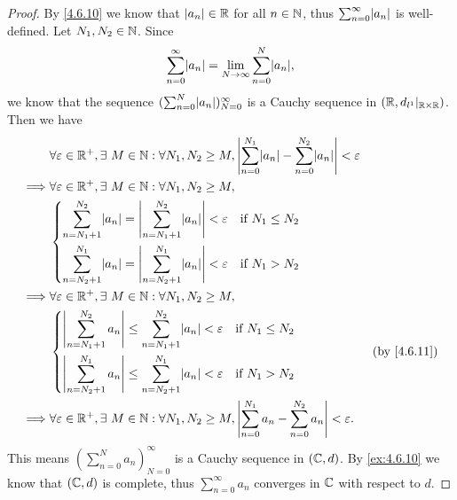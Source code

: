 \begin{proof}
  By \cref{4.6.10} we know that \(\left\lvert a_n\right\rvert \in \mathbb{R}\) for all \(n \in \mathbb{N}\), thus \(\sum_{n = 0}^\infty \abs{a_n}\) is well-defined.
  Let \(N_1, N_2 \in \mathbb{N}\).
  Since
  \[
    \sum_{n = 0}^\infty \abs{a_n} = \lim_{N \to \infty} \sum_{n = 0}^N \abs{a_n},
  \]
  we know that the sequence \((\sum_{n = 0}^N \abs{a_n})_{N = 0}^\infty\) is a Cauchy sequence in \((\mathbb{R}, d_{l^1}|_{\mathbb{R} \times \mathbb{R}})\).
  Then we have
  \begin{align*}
             & \forall \varepsilon \in \R^+, \exists\ M \in \N : \forall N_1, N_2 \geq M, \abs{\sum_{n = 0}^{N_1} \abs{a_n} - \sum_{n = 0}^{N_2} \abs{a_n}} < \varepsilon \\
    \implies & \forall \varepsilon \in \R^+, \exists\ M \in \N : \forall N_1, N_2 \geq M,                                                                                 \\
             & \begin{dcases}
                 \sum_{n = N_1 + 1}^{N_2} \abs{a_n} = \abs{\sum_{n = N_1 + 1}^{N_2} \abs{a_n}} < \varepsilon & \text{if } N_1 \leq N_2 \\
                 \sum_{n = N_2 + 1}^{N_1} \abs{a_n} = \abs{\sum_{n = N_2 + 1}^{N_1} \abs{a_n}} < \varepsilon & \text{if } N_1 > N_2
               \end{dcases}                         \\
    \implies & \forall \varepsilon \in \R^+, \exists\ M \in \N : \forall N_1, N_2 \geq M,                                                                                 \\
             & \begin{dcases}
                 \abs{\sum_{n = N_1 + 1}^{N_2} a_n} \leq \sum_{n = N_1 + 1}^{N_2} \abs{a_n} < \varepsilon & \text{if } N_1 \leq N_2 \\
                 \abs{\sum_{n = N_2 + 1}^{N_1} a_n} \leq \sum_{n = N_2 + 1}^{N_1} \abs{a_n} < \varepsilon & \text{if } N_1 > N_2
               \end{dcases}                                       &  & \text{(by \cref{4.6.11})}                                         \\
    \implies & \forall \varepsilon \in \R^+, \exists\ M \in \N : \forall N_1, N_2 \geq M, \abs{\sum_{n = 0}^{N_1} a_n - \sum_{n = 0}^{N_2} a_n} < \varepsilon.
  \end{align*}
  This means \((\sum_{n = 0}^N a_n)_{N = 0}^\infty\) is a Cauchy sequence in \((\mathbb{C}, d)\).
  By \cref{ex:4.6.10} we know that \((\mathbb{C}, d)\) is complete, thus \(\sum_{n = 0}^\infty a_n\) converges in \(\mathbb{C}\) with respect to \(d\).
\end{proof}

